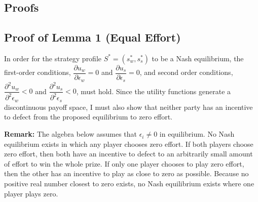 \documentclass[12pt]{article}
\begin{document}
\begin{appendix}


\tableofcontents

\section{Proofs}

\subsection{Proof of Lemma 1 (Equal Effort)}

In order for the strategy profile $ S^* = (s_w^*, s_s^*)$ to be a Nash equilibrium, the first-order conditions, $\dfrac{\partial u_w}{\partial \epsilon_w} = 0$ and $\dfrac{\partial u_s}{\partial \epsilon_s} = 0$, and second order conditions, $\dfrac{\partial ^2u_w}{\partial ^2\epsilon_w} < 0$ and $\dfrac{\partial ^2u_s}{\partial ^2\epsilon_s} < 0$, must hold. Since the utility functions generate a discontinuous payoff space, I must also show that neither party has an incentive to defect from the proposed equilibrium to zero effort.

\textbf{Remark:} The algebra below assumes that $\epsilon_i \neq 0$ in equilibrium. No Nash equilibrium exists in which any player chooses zero effort. If both players choose zero effort, then both have an incentive to defect to an arbitrarily small amount of effort to win the whole prize. If only one player chooses to play zero effort, then the other has an incentive to play as close to zero as possible. Because no positive real number closest to zero exists, no Nash equilibrium exists where one player plays zero.


\end{appendix}
\end{document}
